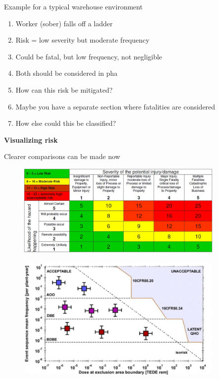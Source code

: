 \documentclass[aspectratio=1610,pdftex,dvipsnames,compress,xcolor={dvipsnames}]{beamer}
\newcommand{\acs}{\acrshort} %
\begin{document}
\begin{frame}{Example for a typical warehouse environment}
    \begin{enumerate}[series=outerlist,topsep=0pt,itemsep=21pt,leftmargin=*,label=(\arabic*)]
        \item[]Worker (sober) falls off a ladder
        \item[]Risk = low severity but moderate frequency
        \item[]Could be fatal, but low frequency, not negligible
        \item[]Both should be considered in \acs{pha}
        \item[]How can this risk be mitigated?
        \item[]Maybe you have a separate section where fatalities are considered
        \item[]How else could this be classified?
    \end{enumerate}
\end{frame}


\begin{frame}[plain]{}
    \centering\LARGE\textbf{Visualizing risk}
\end{frame}


\addtocounter{framenumber}{-1}
\begin{frame}{Clearer comparisons can be made now}
    \begin{figure}
        \centering
        \includegraphics[width=0.90\textwidth]{matrix.jpg}
    \end{figure}
\end{frame}


\begin{frame}{}
    \begin{figure}
        \centering
        \includegraphics[width=0.90\textwidth]{farmer.jpg}
    \end{figure}
\end{frame}
\end{document}
